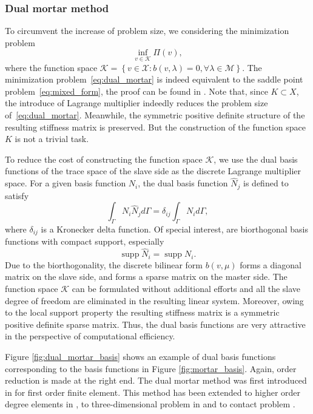 \documentclass[preprint,12pt]{elsarticle}
\newcommand{\supp}{\mathop{\mathrm{supp}}}
\theoremstyle{remark}
\begin{document}
\subsubsection{Dual mortar method}
To circumvent the increase of problem size, we considering the minimization problem 
\begin{equation}
    \inf_{v\in{\mathcal{K}}}\Pi(v), \label{eq:dual_mortar}
\end{equation}
where the function space $\mathcal{K}=\left\{{v\in{\mathcal{X}}\colon{b(v,\lambda)=0, \forall\lambda\in{\mathcal{M}}}}\right\}$. The minimization problem~\eqref{eq:dual_mortar} is indeed equivalent to the saddle point problem~\eqref{eq:mixed_form}, the proof can be found in \cite{boffi_mixed_2013}. Note that, since $K\subset{X}$, the introduce of Lagrange multiplier indeedly reduces the problem size of~\eqref{eq:dual_mortar}. Meanwhile, the symmetric positive definite structure of the resulting stiffness matrix is preserved. But the construction of the function space $K$ is not a trivial task.\par
To reduce the cost of constructing the function space $\mathcal{K}$, we use the dual basis functions of the trace space of the slave side as the discrete Lagrange multiplier space. For a given basis function $N_i$, the dual basis function $\hat{N}_j$ is defined to satisfy
\begin{equation}
    \int_\Gamma{N_i\hat{N}_j}d\Gamma=\delta_{ij}\int_\Gamma{}N_id\Gamma,
\end{equation}
where $\delta_{ij}$ is a Kronecker delta function. Of special interest, are biorthogonal basis functions with compact support, especially
\begin{equation}
    \supp{\hat{N}_i}=\supp{{N}_i}.
\end{equation}
Due to the biorthogonality, the discrete bilinear form $b(v,\mu)$ forms a diagonal matrix on the slave side, and forms a sparse matrix on the master side. The function space $\mathcal{K}$ can be formulated without additional efforts and all the slave degree of freedom are eliminated in the resulting linear system. Moreover, owing to the local support property the resulting stiffness matrix is a symmetric positive definite sparse matrix. Thus, the dual basis functions are very attractive in the perspective of computational efficiency. 

Figure \ref{fig:dual_mortar_basis} shows an example of dual basis functions corresponding to the basis functions in Figure \ref{fig:mortar_basis}. Again, order reduction is made at the right end. The dual mortar method was first introduced in \cite{wohlmuth_mortar_2000} for first order finite element. This method has been extended to higher order degree elements in \cite{lamichhane2002higher}, to three-dimensional problem in \cite{wohlmuth2002comparison} and to contact problem \cite{hueber2005primal, popp2009finite}.\par
\end{document}
